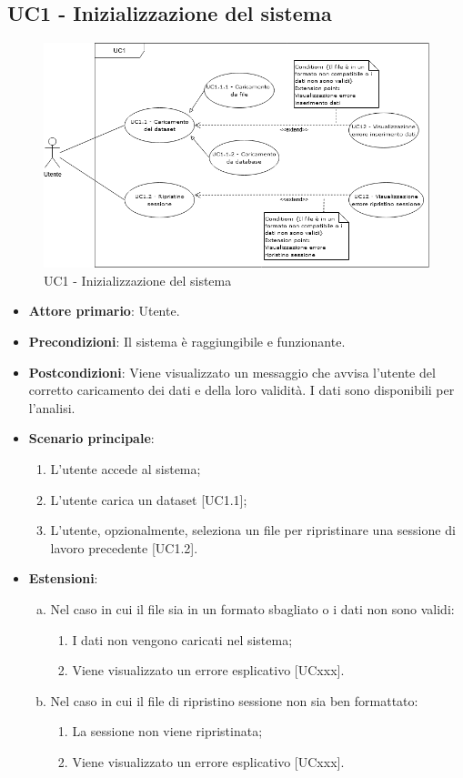 \subsection{UC1 - Inizializzazione del sistema}
\begin{figure}[h]
\includegraphics[width=\linewidth]{section/Images/UC1.png}
\centering
\caption{UC1 - Inizializzazione del sistema}
\end{figure}
\begin{itemize}
	\item \textbf{Attore primario}: Utente.
	\item \textbf{Precondizioni}: Il sistema è raggiungibile e funzionante.
	\item \textbf{Postcondizioni}: Viene visualizzato un messaggio che avvisa l'utente del corretto caricamento dei dati e della loro validità. I dati sono disponibili per l'analisi.
	\item \textbf{Scenario principale}:
		\begin{enumerate}
			\item L'utente accede al sistema;
			\item L'utente carica un dataset [UC1.1];
			\item L'utente, opzionalmente, seleziona un file per ripristinare una sessione di lavoro precedente [UC1.2].
			
		\end{enumerate}
	\item \textbf{Estensioni}:
	\begin{enumerate}[(a)]
		\item Nel caso in cui il file sia in un formato sbagliato o i dati non sono validi:
		\begin{enumerate}[1.]
			\item I dati non vengono caricati nel sistema;
			\item Viene visualizzato un errore esplicativo [UCxxx].
		\end{enumerate}
		
		\item Nel caso in cui il file di ripristino sessione non sia ben formattato:
		\begin{enumerate}[1.]
			\item La sessione non viene ripristinata;
			\item Viene visualizzato un errore esplicativo [UCxxx].
		\end{enumerate}
	\end{enumerate}
\end{itemize}






  